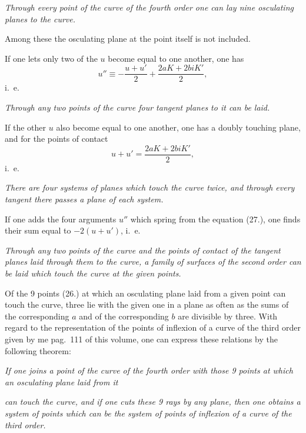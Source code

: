\documentclass{article}
\begin{document}
\emph{Through every point of the curve of the fourth order one can lay nine osculating planes to the curve.}

Among these the osculating plane at the point itself is not included.

If one lets only two of the $u$ become equal to one another, one has
\[
u'' \equiv -\frac{u+u'}{2}+\frac{2aK+2biK'}{2}, \tag{27.}
\]
i.\ e.

\emph{Through any two points of the curve four tangent planes to it can be laid.}

If the other $u$ also become equal to one another, one has a doubly touching plane, and for the points of contact
\[
u+u' = \frac{2aK+2biK'}{2}, \tag{28.}
\]
i.\ e.

\emph{There are four systems of planes which touch the curve twice, and through every tangent there passes a plane of each system.}

If one adds the four arguments $u''$ which spring from the equation (27.), one finds their sum equal to $-2(u+u')$, i.\ e.

\emph{Through any two points of the curve and the points of contact of the tangent planes laid through them to the curve, a family of surfaces of the second order can be laid which touch the curve at the given points.}

Of the 9 points (26.) at which an osculating plane laid from a given point can touch the curve, three lie with the given one in a plane as often as the sums of the corresponding $a$ and of the corresponding $b$ are divisible by three. With regard to the representation of the points of inflexion of a curve of the third order given by me pag.\ 111 of this volume, one can express these relations by the following theorem:

\emph{If one joins a point of the curve of the fourth order with those 9 points at which an osculating plane laid from it}

\emph{can touch the curve, and if one cuts these 9 rays by any plane, then one obtains a system of points which can be the system of points of inflexion of a curve of the third order.}
\end{document}
